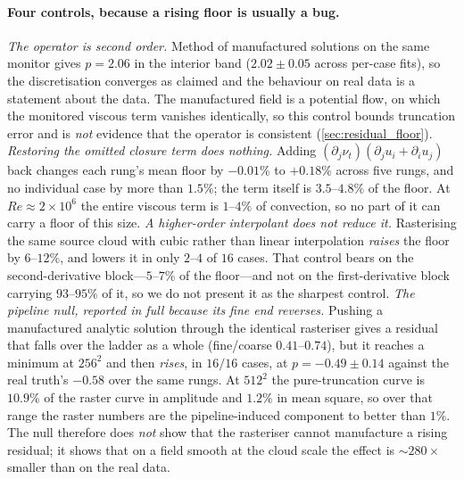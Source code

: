 \paragraph{Four controls, because a rising floor is usually a bug.}
\emph{The operator is second order.} Method of manufactured solutions on the same
monitor gives $p=2.06$ in the interior band ($2.02\pm0.05$ across per-case fits), so the
discretisation converges as claimed and the behaviour on real data is a statement about
the data. The manufactured field is a potential flow, on which the monitored viscous
term vanishes identically, so this control bounds truncation error and is \emph{not}
evidence that the operator is consistent (\autoref{sec:residual_floor}).
\emph{Restoring the omitted closure term does nothing.} Adding
$(\partial_j\nu_t)(\partial_j u_i+\partial_i u_j)$ back changes each rung's mean floor
by $-0.01\%$ to $+0.18\%$ across five rungs, and no individual case by more than
$1.5\%$; the term itself is $3.5$--$4.8\%$ of the floor. At $Re\approx2\times10^6$ the
entire viscous term is $1$--$4\%$ of convection, so no part of it can carry a floor of
this size.
\emph{A higher-order interpolant does not reduce it.} Rasterising the same source cloud
with cubic rather than linear interpolation \emph{raises} the floor by $6$--$12\%$, and
lowers it in only $2$--$4$ of $16$ cases. That control bears on the second-derivative
block---$5$--$7\%$ of the floor---and not on the first-derivative block carrying
$93$--$95\%$ of it, so we do not present it as the sharpest control.
\emph{The pipeline null, reported in full because its fine end reverses.} Pushing a
manufactured analytic solution through the identical rasteriser gives a residual that
falls over the ladder as a whole (fine/coarse $0.41$--$0.74$), but it reaches a minimum
at $256^2$ and then \emph{rises}, in $16/16$ cases, at $p=-0.49\pm0.14$ against the real
truth's $-0.58$ over the same rungs. At $512^2$ the pure-truncation curve is $10.9\%$ of
the raster curve in amplitude and $1.2\%$ in mean square, so over that range the raster
numbers are the pipeline-induced component to better than $1\%$. The null therefore does
\emph{not} show that the rasteriser cannot manufacture a rising residual; it shows that
on a field smooth at the cloud scale the effect is ${\sim}280\times$ smaller than on the
real data.

